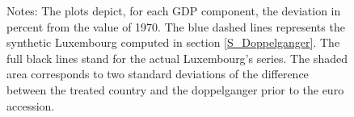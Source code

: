 \documentclass[12pt]{article}
\newcommand{\annote}[1]{\parbox{\textwidth}{\renewcommand{\baselinestretch}{1.0}\vspace{12pt} \small Notes: #1}}
\begin{document}
\begin{figure}[h!]
    \annote{The plots depict, for each GDP component, the deviation in percent from the value of 1970. The blue dashed lines represents the synthetic Luxembourg computed in section \ref{S_Doppelganger}. The full black lines stand for the actual Luxembourg's series. The shaded area corresponds to two standard deviations of the difference between the treated country and the doppelganger prior to the euro accession. }
\end{figure}
\end{document}
